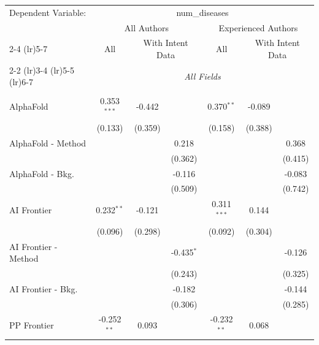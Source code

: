 \begingroup
\centering
\begin{tabular}{lcccccc}
   \tabularnewline \midrule \midrule
   Dependent Variable: & \multicolumn{6}{c}{num\_diseases}\\
 & \multicolumn{3}{c}{All Authors} & \multicolumn{3}{c}{Experienced Authors} \\
\cmidrule(lr){2-4} \cmidrule(lr){5-7}
 & \multicolumn{1}{c}{All} & \multicolumn{2}{c}{With Intent Data} & \multicolumn{1}{c}{All} & \multicolumn{2}{c}{With Intent Data} \\
\cmidrule(lr){2-2} \cmidrule(lr){3-4} \cmidrule(lr){5-5} \cmidrule(lr){6-7}
 & \multicolumn{6}{c}{\textit{All Fields}} \\ \\
   AlphaFold            & 0.353$^{***}$ & -0.442  &              & 0.370$^{**}$  & -0.089  &   \\   
                        & (0.133)       & (0.359) &              & (0.158)       & (0.388) &   \\   
   AlphaFold - Method   &               &         & 0.218        &               &         & 0.368\\   
                        &               &         & (0.362)      &               &         & (0.415)\\   
   AlphaFold - Bkg.     &               &         & -0.116       &               &         & -0.083\\   
                        &               &         & (0.509)      &               &         & (0.742)\\   
   AI Frontier          & 0.232$^{**}$  & -0.121  &              & 0.311$^{***}$ & 0.144   &   \\   
                        & (0.096)       & (0.298) &              & (0.092)       & (0.304) &   \\   
   AI Frontier - Method &               &         & -0.435$^{*}$ &               &         & -0.126\\   
                        &               &         & (0.243)      &               &         & (0.325)\\   
   AI Frontier - Bkg.   &               &         & -0.182       &               &         & -0.144\\   
                        &               &         & (0.306)      &               &         & (0.285)\\   
   PP Frontier          & -0.252$^{**}$ & 0.093   &              & -0.232$^{**}$ & 0.068   &   \\   

\end{tabular}
